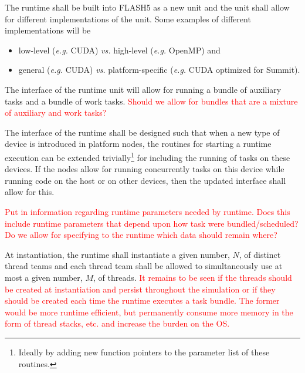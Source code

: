 \documentclass{article}
\begin{document}
\begin{req}
The runtime shall be built into FLASH5 as a new unit and the unit shall allow
for different implementations of the unit.  Some examples of different
implementations will be
\begin{itemize}
\item{low-level (\textit{e.g.} CUDA) \textit{vs.} high-level
(\textit{e.g.} OpenMP) and}
\item{general (\textit{e.g.} CUDA) \textit{vs.}} platform-specific
(\textit{e.g.} CUDA optimized for Summit).
\end{itemize}
The interface of the runtime unit will allow for running a bundle of auxiliary
tasks and a bundle of work tasks.  \textcolor{red}{Should we allow for bundles
that are a mixture of auxiliary and work tasks?}
\end{req}

\begin{req}
The interface of the runtime shall be designed such  that when a new type of
device is introduced in platform nodes, the routines for starting a runtime
execution can be extended trivially\footnote{Ideally by adding new function
pointers to the parameter list of these routines.} for including the running of
tasks on these devices.  If the nodes allow for running concurrently tasks on
this device while running code on the host or on other devices, then the updated
interface shall allow for this.
\end{req}

\textcolor{red}{Put in information regarding runtime parameters needed by
runtime.  Does this include runtime parameters that depend upon how task were
bundled/scheduled?}\\

\textcolor{red}{Do we allow for specifying to the runtime which data should
remain where?}\\

\begin{req}
At instantiation, the runtime shall instantiate a given number, $N$, of distinct
thread teams and each thread team shall be allowed to simultaneously use
at most a given number, $M$, of threads.  \textcolor{red}{It remains to be seen
if the threads should be created at instantiation and persist throughout the
simulation or if they should be created each time the runtime executes a task
bundle.  The former would be more runtime efficient, but permanently consume
more memory in the form of thread stacks, etc. and increase the burden on the
OS.}
\end{req}
\end{document}
